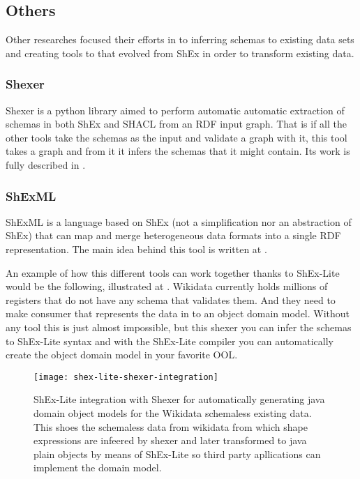 \subsection{Others}
Other researches focused their efforts in to inferring schemas to existing data sets and creating tools to that evolved from ShEx in order to transform existing data.

\subsubsection{Shexer}
Shexer is a python library aimed to perform automatic automatic extraction of schemas in both ShEx and SHACL from an RDF input graph. That is if all the other tools take the schemas as the input and validate a graph with it, this tool takes a graph and from it it infers the schemas that it might contain. Its work is fully described in .

\subsubsection{ShExML}
ShExML is a language based on ShEx (not a simplification nor an abstraction of ShEx) that can map and merge heterogeneous data formats into a single RDF representation. The main idea behind this tool is written at .

\bigskip

An example of how this different tools can work together thanks to ShEx-Lite would be the following, illustrated at .
Wikidata currently holds millions of registers that do not have any schema that validates them. And they need to make consumer that represents the data in to an object domain model. Without any tool this is just almost impossible, but this shexer you can infer the schemas to ShEx-Lite syntax and with the ShEx-Lite compiler you can automatically create the object domain model in your favorite OOL.

\begin{figure*}[h!]
	\texttt{[image: shex-lite-shexer-integration]}
	\caption[ShEx-Lite integration with Shexer]{ShEx-Lite integration with Shexer for automatically generating java domain object models for the Wikidata schemaless existing data. This shoes the schemaless data from wikidata from which shape expressions are infeered by shexer and later transformed to java plain objects by means of ShEx-Lite so third party apllications can implement the domain model.}
\end{figure*}